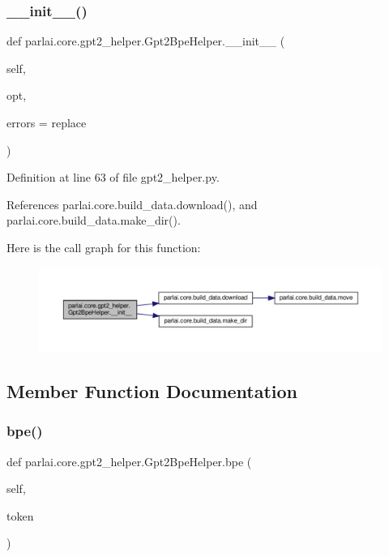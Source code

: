 \subsubsection{\texorpdfstring{\+\_\+\+\_\+init\+\_\+\+\_\+()}{\_\_init\_\_()}}
{\footnotesize\ttfamily def parlai.\+core.\+gpt2\+\_\+helper.\+Gpt2\+Bpe\+Helper.\+\_\+\+\_\+init\+\_\+\+\_\+ (\begin{DoxyParamCaption}\item[{}]{self,  }\item[{}]{opt,  }\item[{}]{errors = {\ttfamily \textquotesingle{}replace\textquotesingle{}} }\end{DoxyParamCaption})}



Definition at line 63 of file gpt2\+\_\+helper.\+py.



References parlai.\+core.\+build\+\_\+data.\+download(), and parlai.\+core.\+build\+\_\+data.\+make\+\_\+dir().

Here is the call graph for this function\+:
\nopagebreak
\begin{figure}[H]
\begin{center}
\leavevmode
\includegraphics[width=350pt]{classparlai_1_1core_1_1gpt2__helper_1_1Gpt2BpeHelper_a5c9324bab66b00f6f977aef0241927bd_cgraph}
\end{center}
\end{figure}


\subsection{Member Function Documentation}
\mbox{\label{classparlai_1_1core_1_1gpt2__helper_1_1Gpt2BpeHelper_ac2bbb343b37bc277bf717b87ed675ff9}} 
\subsubsection{\texorpdfstring{bpe()}{bpe()}}
{\footnotesize\ttfamily def parlai.\+core.\+gpt2\+\_\+helper.\+Gpt2\+Bpe\+Helper.\+bpe (\begin{DoxyParamCaption}\item[{}]{self,  }\item[{}]{token }\end{DoxyParamCaption})}



